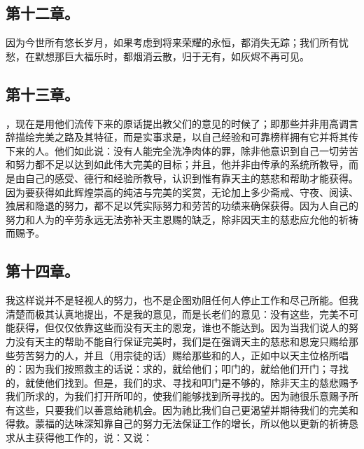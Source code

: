 \subsection{第十二章。}

\par

因为今世所有悠长岁月，如果考虑到将来荣耀的永恒，都消失无踪；我们所有忧愁，在默想那巨大福乐时，都烟消云散，归于无有，如灰烬不再可见。\par


\subsection{第十三章。}

\par

，现在是用他们流传下来的原话提出教父们的意见的时候了；即那些并非用高调言辞描绘完美之路及其特征，而是实事求是，以自己经验和可靠榜样拥有它并将其传下来的人。他们如此说：没有人能完全洗净肉体的罪，除非他意识到自己一切劳苦和努力都不足以达到如此伟大完美的目标；并且，他并非由传承的系统所教导，而是由自己的感受、德行和经验所教导，认识到惟有靠天主的慈悲和帮助才能获得。因为要获得如此辉煌崇高的纯洁与完美的奖赏，无论加上多少斋戒、守夜、阅读、独居和隐退的努力，都不足以凭实际努力和劳苦的功绩来确保获得。因为人自己的努力和人为的辛劳永远无法弥补天主恩赐的缺乏，除非因天主的慈悲应允他的祈祷而赐予。\par


\subsection{第十四章。}

\par

我这样说并不是轻视人的努力，也不是企图劝阻任何人停止工作和尽己所能。但我清楚而极其认真地提出，不是我的意见，而是长老们的意见：没有这些，完美不可能获得，但仅仅依靠这些而没有天主的恩宠，谁也不能达到。因为当我们说人的努力没有天主的帮助不能自行保证完美时，我们是在强调天主的慈悲和恩宠只赐给那些劳苦努力的人，并且（用宗徒的话）赐给那些和的人，正如中以天主位格所唱的：因为我们按照救主的话说：求的，就给他们；叩门的，就给他们开门；寻找的，就使他们找到。但是，我们的求、寻找和叩门是不够的，除非天主的慈悲赐予我们所求的，为我们打开所叩的，使我们能够找到所寻找的。因为祂很乐意赐予所有这些，只要我们以善意给祂机会。因为祂比我们自己更渴望并期待我们的完美和得救。蒙福的达味深知靠自己的努力无法保证工作的增长，所以他以更新的祈祷恳求从主获得他工作的，说：又说：\par

